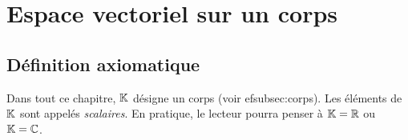 \section{Espace vectoriel sur un corps}\label{sec:ev-definition}

\subsection{Définition axiomatique}\label{subsec:ev-axiomes}

Dans tout ce chapitre, ${\mathbb{K}}$ désigne un corps (voir 
ef{subsec:corps}).
Les éléments de ${\mathbb{K}}$ sont appelés \emph{scalaires}. En
pratique, le lecteur pourra penser à ${\mathbb{K}}={\mathbb{R}}$ ou ${\mathbb{K}}={\mathbb{C}}$.

